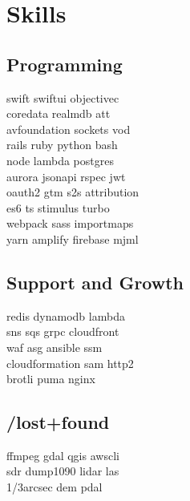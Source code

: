 \documentclass[]{plushcv}
\begin{document}
\begin{minipage}[t]{0.70\textwidth}

\end{minipage} 
\hfill
\begin{minipage}[t]{0.25\textwidth} 


\section{Skills}
\subsection{Programming}
\sectionsep
{}
swift \textbullet{} swiftui \textbullet{} objectivec  \\ 
coredata \textbullet{} realmdb \textbullet{} att \\
avfoundation \textbullet{} sockets \textbullet{} vod \\
\sectionsep
{}
rails \textbullet{} ruby \textbullet{} python \textbullet{} bash \\
node \textbullet{} lambda \textbullet{} postgres   \\
aurora \textbullet{} jsonapi \textbullet{} rspec \textbullet{} jwt \\
oauth2 \textbullet{} gtm \textbullet{} s2s attribution \\
\sectionsep
{}
es6 \textbullet{} ts \textbullet{} stimulus \textbullet{} turbo \\
webpack \textbullet{} sass \textbullet{} importmaps \\
yarn \textbullet{} amplify \textbullet{} firebase \textbullet{} mjml \\
\sectionsep
\sectionsep
\subsection{Support and Growth}
\sectionsep
redis \textbullet{} dynamodb \textbullet{} lambda \\
sns \textbullet{} sqs \textbullet{} grpc \textbullet{} cloudfront \\
waf \textbullet{} asg \textbullet{} ansible \textbullet{} ssm \\
cloudformation \textbullet{} sam \textbullet{} http2 \\
brotli \textbullet{} puma \textbullet{} nginx \\


\sectionsep
\sectionsep
\subsection{/lost+found}
\sectionsep
ffmpeg \textbullet{} gdal \textbullet{} qgis \textbullet{} awscli  \\
sdr \textbullet{} dump1090 \textbullet{} lidar las \\
1/3arcsec dem \textbullet{} pdal \\





\end{minipage}
\end{document}
